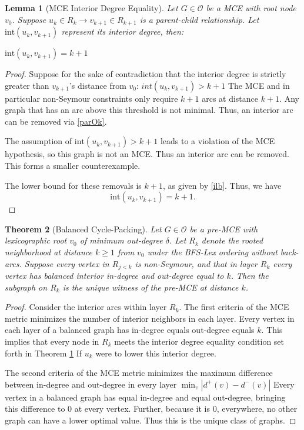 \documentclass[AMS, Times1COL]{article} %
\newtheorem{theorem}{Theorem}[section]
\newtheorem{lemma}[theorem]{Lemma}
\theoremstyle{definition}
\begin{document}
	\begin{lemma}[MCE Interior Degree Equality]
		Let $G \in \mathcal{O}$ be a MCE with root node $v_0$. Suppose $u_k \in R_k \to v_{k+1} \in R_{k+1}$ is a parent-child relationship. Let $\text{int}(u_k, v_{k+1})$ represent its interior degree, then:
		
		$\text{int}(u_k, v_{k+1}) = k+1$
		\label{MCEInt}
	\end{lemma}
	\begin{proof}
		Suppose for the sake of contradiction that the interior degree is strictly greater than $v_{k+1}$'s distance from $v_0$:
		$int(u_k, v_{k+1})>k+1$
		The MCE and in particular non-Seymour constraints only require $k+1$ arcs at distance $k+1$. 
		Any graph that has an arc above this threshold is not minimal. 
		Thus, an interior arc can be removed via \ref{parOk}. 
		
		The assumption of $\text{int}(u_k, v_{k+1}) > k+1$ leads to a violation of the MCE hypothesis, so this graph is not an MCE. 
		Thus an interior arc can be removed. This forms a smaller counterexample. 
		
		The lower bound for these removals is $k+1$, as given by \ref{ilb}. 
		Thus, we have $$\text{int}(u_k, v_{k+1}) = k+1.$$
	\end{proof}
	
	\begin{theorem}[Balanced Cycle-Packing]
		Let $G \in \mathcal{O}$ be a pre-MCE with lexicographic root $v_0$ of minimum out-degree $\delta$. 
		Let $R_k$ denote the rooted neighborhood at distance $k \ge 1$ from $v_0$ under the BFS-Lex ordering without back-arcs. 
		Suppose every vertex in $R_{j < k}$ is non-Seymour, and that in layer $R_k$ every vertex has balanced interior in-degree and out-degree equal to $k$. 
		Then the subgraph on $R_k$ is the unique witness of the pre-MCE at distance $k$.
		\label{thm_bal_wit}
	\end{theorem}
	
	
	\begin{proof}
		Consider the interior arcs within layer $R_k$. 
		The first criteria of the MCE metric minimizes the number of interior neighbors in each layer. 
		Every vertex in each layer of a balanced graph has in-degree equals out-degree equals $k$. 
		This implies that every node in $R_k$ meets the interior degree equality 
		condition set forth in Theorem \ref{MCEInt}
		If $u_k$ were to lower this interior degree. 

		The second criteria of the MCE metric minimizes the maximum difference between in-degree and out-degree in every layer $\min_v{|d^+(v) - d^-(v)|}$
		Every vertex in a balanced graph has equal in-degree and equal out-degree, bringing this difference to 0 at every vertex. Further, because it is 0, everywhere, no other graph can have a lower optimal value. Thus this is the unique class of graphs. 
	\end{proof}
	
\end{document}
